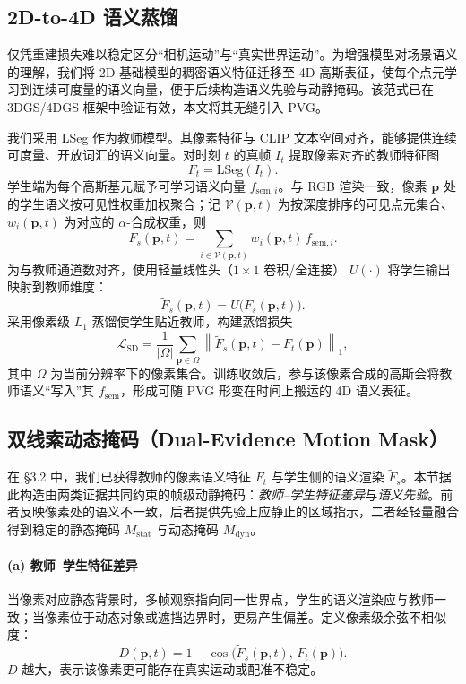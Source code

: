 \documentclass[10pt,conference]{IEEEtran} %
\begin{document}
\subsection{2D\mbox{-}to\mbox{-}4D 语义蒸馏}
仅凭重建损失难以稳定区分“相机运动”与“真实世界运动”。为增强模型对场景语义的理解，我们将 2D 基础模型的稠密语义特征迁移至 4D 高斯表征，使每个点元学习到连续可度量的语义向量，便于后续构造语义先验与动静掩码。该范式已在 3DGS/4DGS 框架中验证有效，本文将其无缝引入 PVG。

我们采用 LSeg 作为教师模型。其像素特征与 CLIP 文本空间对齐，能够提供连续可度量、开放词汇的语义向量。对时刻 $t$ 的真帧 $I_t$ 提取像素对齐的教师特征图
\[
F_t=\mathrm{LSeg}(I_t).
\]
学生端为每个高斯基元赋予可学习语义向量 $f_{\text{sem},i}$。与 RGB 渲染一致，像素 $\mathbf p$ 处的学生语义按可见性权重加权聚合；记 $\mathcal V(\mathbf p,t)$ 为按深度排序的可见点元集合、$w_i(\mathbf p,t)$ 为对应的 $\alpha$-合成权重，则
\begin{equation}
F_s(\mathbf p,t)=\sum_{i\in\mathcal V(\mathbf p,t)} w_i(\mathbf p,t)\,f_{\text{sem},i}.
\label{eq:feature_render}
\end{equation}
为与教师通道数对齐，使用轻量线性头（$1{\times}1$ 卷积/全连接） $U(\cdot)$ 将学生输出映射到教师维度：
\[
\tilde F_s(\mathbf p,t)=U\!\big(F_s(\mathbf p,t)\big).
\]
采用像素级 $L_1$ 蒸馏使学生贴近教师，构建蒸馏损失
\[
\mathcal{L}_{\mathrm{SD}}
=\frac{1}{|\Omega|}\sum_{\mathbf p\in\Omega}\left\|\tilde F_s(\mathbf p,t)-F_t(\mathbf p)\right\|_1,
\]
其中 $\Omega$ 为当前分辨率下的像素集合。训练收敛后，参与该像素合成的高斯会将教师语义“写入”其 $f_{\mathrm{sem}}$，形成可随 PVG 形变在时间上搬运的 4D 语义表征。

\subsection{双线索动态掩码（Dual\mbox{-}Evidence Motion Mask）}
在 §3.2 中，我们已获得教师的像素语义特征 $F_t$ 与学生侧的语义渲染 $\tilde F_s$。本节据此构造由两类证据共同约束的帧级动静掩码：\emph{教师--学生特征差异}与\emph{语义先验}。前者反映像素处的语义不一致，后者提供先验上应静止的区域指示，二者经轻量融合得到稳定的静态掩码 $M_{\mathrm{stat}}$ 与动态掩码 $M_{\mathrm{dyn}}$。

\paragraph{(a) 教师--学生特征差异}
当像素对应静态背景时，多帧观察指向同一世界点，学生的语义渲染应与教师一致；当像素位于动态对象或遮挡边界时，更易产生偏差。定义像素级余弦不相似度：
\begin{equation}
D(\mathbf p,t)=1-\cos\!\big(\tilde F_s(\mathbf p,t),\,F_t(\mathbf p)\big).
\end{equation}
$D$ 越大，表示该像素更可能存在真实运动或配准不稳定。
\end{document}
